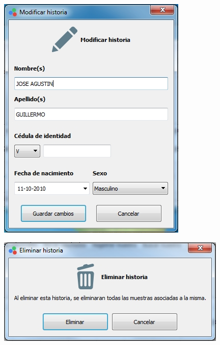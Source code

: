 \begin{figure}[H]
\centering
\begin{minipage}{.5\textwidth}
  \centering
  \includegraphics[width=.9\linewidth]{./img/modificar-historia.jpg}
  \label{fig:test1}
\end{minipage}%
\begin{minipage}{.5\textwidth}
  \centering
  \includegraphics[width=1\linewidth]{./img/eliminar-historia.jpg}
  \label{fig:test2}
\end{minipage}
\end{figure}

